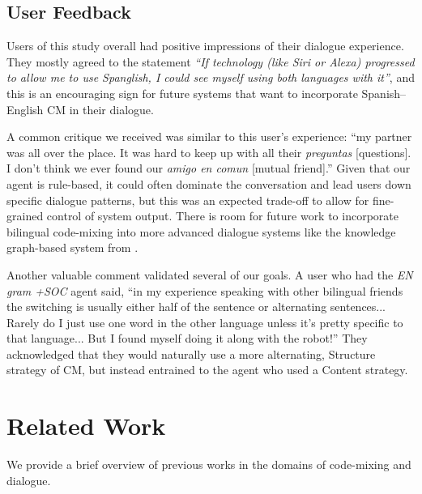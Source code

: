 \documentclass[11pt,a4paper]{article}
\begin{document}
\subsection{User Feedback}
Users of this study overall had positive impressions of their dialogue experience.
They mostly agreed to the statement \textit{``If technology (like Siri or Alexa) progressed to allow me to use Spanglish, I could see myself using both languages with it''}, and this is an encouraging sign for future systems that want to incorporate Spanish--English CM in their dialogue.

A common critique we received was similar to this user's experience: ``my partner was all over the place. It was hard to keep up with all their \textit{preguntas} [questions]. I don't think we ever found our \textit{amigo en comun} [mutual friend].''
Given that our agent is rule-based, it could often dominate the conversation and lead users down specific dialogue patterns, but this was an expected trade-off to allow for fine-grained control of system output.
There is room for future work to incorporate bilingual code-mixing into more advanced dialogue systems like the knowledge graph-based system from \citet{He2017}.

Another valuable comment validated several of our goals.
A user who had the \textit{EN gram +SOC} agent said, ``in my experience speaking with other bilingual friends the switching is usually either half of the sentence or alternating sentences... Rarely do I just use one word in the other language unless it's pretty specific to that language... But I found myself doing it along with the robot!''
They acknowledged that they would naturally use a more alternating, Structure strategy of CM, but instead entrained to the agent who used a Content strategy.


\section{Related Work}
\label{sec:related-work}

We provide a brief overview of previous works in the domains of code-mixing and dialogue.

\end{document}
